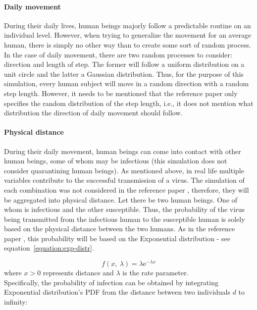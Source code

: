 \documentclass[a4paper]{article}
\begin{document}
\paragraph{Daily movement}
During their daily lives, human beings majorly follow a predictable routine on an individual level. However, when trying to generalize the movement for an average human, there is simply no other way than to create some sort of random process. In the case of daily movement, there are two random processes to consider: direction and length of step. The former will follow a uniform distribution on a unit circle and the latter a Gaussian distribution. Thus, for the purpose of this simulation, every human subject will move in a random direction with a random step length. However, it needs to be mentioned that the reference paper \cite{Maltezos2021} only specifies the random distribution of the step length, i.e., it does not mention what distribution the direction of daily movement should follow.

\paragraph{Physical distance}
During their daily movement, human beings can come into contact with other human beings, some of whom may be infectious (this simulation does not consider quarantining human beings). As mentioned above, in real life multiple variables contribute to the successful transmission of a virus. The simulation of each combination was not considered in the reference paper \cite{Maltezos2021}, therefore, they will be aggregated into physical distance. Let there be two human beings. One of whom is infectious and the other susceptible. Thus, the probability of the virus being transmitted from the infectious human to the susceptible human is solely based on the physical distance between the two humans. As in the reference paper \cite{Maltezos2021}, this probability will be based on the Exponential distribution - see equation~\eqref{equation:exp-distr}.

\begin{equation}
	f(x,\:\lambda) = \lambda \mathrm{e}^{-\lambda x}
	\label{equation:exp-distr}
\end{equation}
\noindent
where $x > 0$ represents distance and $\lambda$ is the rate parameter. \\
Specifically, the probability of infection can be obtained by integrating Exponential distribution's PDF from the distance between two individuals $d$ to infinity:
\end{document}
